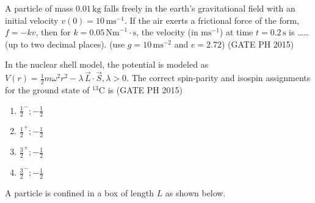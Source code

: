 \iffalse
\chapter{2015}
\author{AI24BTECH11030}
\section{ph}
\fi

\item
A particle of mass \(0.01 \, \text{kg}\) falls freely in the earth's gravitational field with an initial velocity \( v(0) = 10 \, \text{ms}^{-1} \). If the air exerts a frictional force of the form, \( f = -kv \), then for \( k = 0.05 \, \text{Nm}^{-1} \cdot \text{s} \), the velocity (in \(\text{ms}^{-1}\)) at time \( t = 0.2 \, \text{s} \) is \ldots\ldots (up to two decimal places). (use \( g = 10 \, \text{ms}^{-2} \) and \( e = 2.72 \)) \hfill (GATE PH 2015)

\item
In the nuclear shell model, the potential is modeled as
\(
V(r) = \frac{1}{2} m \omega^2 r^2 - \lambda \, \vec{L} \cdot \vec{S}, \lambda > 0.
\)
The correct spin-parity and isospin assignments for the ground state of \( ^{13}\text{C} \) is \hfill (GATE PH 2015)

\begin{multicols}{4}
    \begin{enumerate}
        \item \( \frac{1}{2}^- ; -\frac{1}{2} \)
        \item \( \frac{1}{2}^+ ; -\frac{1}{2} \)
        \item \( \frac{3}{2}^+ ; -\frac{1}{2} \)
        \item \( \frac{3}{2}^- ; -\frac{1}{2} \)
    \end{enumerate}
\end{multicols}

\item
A particle is confined in a box of length \( L \) as shown below.

\begin{center}
\end{center}

